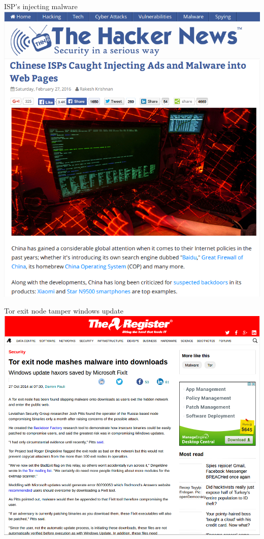 \documentclass[11pt]{beamer}
\begin{document}
\begin{frame}{ISP's injecting malware}
\includegraphics[scale=0.28]{isp_malware.png}
\end{frame}

\begin{frame}{Tor exit node tamper windows update}
\includegraphics[scale=0.3]{tor_exit_windows_update.png}
\end{frame}
\end{document}
